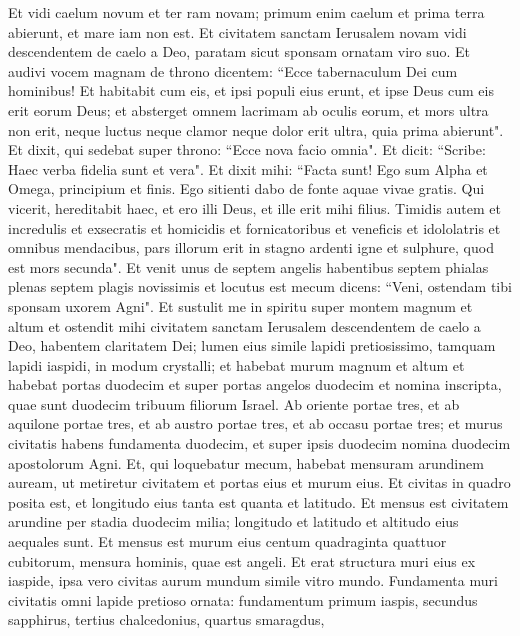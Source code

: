 \begin{biblechapter}  
\verse Et vidi caelum novum et ter ram novam; primum enim caelum et prima terra abierunt, et mare iam non est. 
\verse Et civitatem sanctam Ierusalem novam vidi descendentem de caelo a Deo, paratam sicut sponsam ornatam viro suo. 
\verse Et audivi vocem magnam de throno dicentem: “Ecce tabernaculum Dei cum hominibus! Et habitabit cum eis, et ipsi populi eius erunt, et ipse Deus cum eis erit eorum Deus; 
\verse et absterget omnem lacrimam ab oculis eorum, et mors ultra non erit, neque luctus neque clamor neque dolor erit ultra, quia prima abierunt". 
\verse Et dixit, qui sedebat super throno: “Ecce nova facio omnia". Et dicit: “Scribe: Haec verba fidelia sunt et vera". 
\verse Et dixit mihi: “Facta sunt! Ego sum Alpha et Omega, principium et finis. Ego sitienti dabo de fonte aquae vivae gratis. 
\verse Qui vicerit, hereditabit haec, et ero illi Deus, et ille erit mihi filius. 
\verse Timidis autem et incredulis et exsecratis et homicidis et fornicatoribus et veneficis et idololatris et omnibus mendacibus, pars illorum erit in stagno ardenti igne et sulphure, quod est mors secunda". 
\verse Et venit unus de septem angelis habentibus septem phialas plenas septem plagis novissimis et locutus est mecum dicens: “Veni, ostendam tibi sponsam uxorem Agni". 
\verse Et sustulit me in spiritu super montem magnum et altum et ostendit mihi civitatem sanctam Ierusalem descendentem de caelo a Deo, 
\verse habentem claritatem Dei; lumen eius simile lapidi pretiosissimo, tamquam lapidi iaspidi, in modum crystalli; 
\verse et habebat murum magnum et altum et habebat portas duodecim et super portas angelos duodecim et nomina inscripta, quae sunt duodecim tribuum filiorum Israel. 
\verse Ab oriente portae tres, et ab aquilone portae tres, et ab austro portae tres, et ab occasu portae tres; 
\verse et murus civitatis habens fundamenta duodecim, et super ipsis duodecim nomina duodecim apostolorum Agni. 
\verse Et, qui loquebatur mecum, habebat mensuram arundinem auream, ut metiretur civitatem et portas eius et murum eius. 
\verse Et civitas in quadro posita est, et longitudo eius tanta est quanta et latitudo. Et mensus est civitatem arundine per stadia duodecim milia; longitudo et latitudo et altitudo eius aequales sunt. 
\verse Et mensus est murum eius centum quadraginta quattuor cubitorum, mensura hominis, quae est angeli. 
\verse Et erat structura muri eius ex iaspide, ipsa vero civitas aurum mundum simile vitro mundo. 
\verse Fundamenta muri civitatis omni lapide pretioso ornata: fundamentum primum iaspis, secundus sapphirus, tertius chalcedonius, quartus smaragdus, 

\end{biblechapter}
